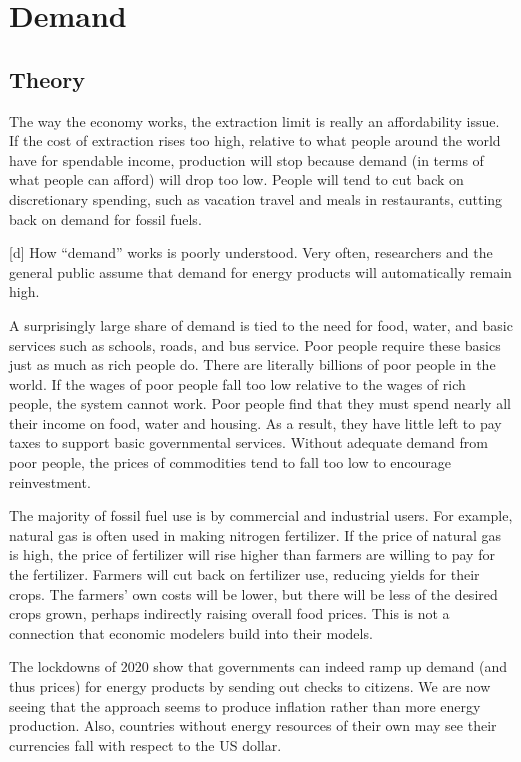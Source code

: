 \documentclass[
]{book}
\begin{document}
\hypertarget{demand}{%
\chapter{Demand}\label{demand}}

\hypertarget{theory}{%
\section{Theory}\label{theory}}

The way the economy works, the extraction limit is really an affordability issue. If the cost of extraction rises too high, relative to what people around the world have for spendable income, production will stop because demand (in terms of what people can afford) will drop too low. People will tend to cut back on discretionary spending, such as vacation travel and meals in restaurants, cutting back on demand for fossil fuels.

{[}d{]} How ``demand'' works is poorly understood. Very often, researchers and the general public assume that demand for energy products will automatically remain high.

A surprisingly large share of demand is tied to the need for food, water, and basic services such as schools, roads, and bus service. Poor people require these basics just as much as rich people do. There are literally billions of poor people in the world. If the wages of poor people fall too low relative to the wages of rich people, the system cannot work. Poor people find that they must spend nearly all their income on food, water and housing. As a result, they have little left to pay taxes to support basic governmental services. Without adequate demand from poor people, the prices of commodities tend to fall too low to encourage reinvestment.

The majority of fossil fuel use is by commercial and industrial users. For example, natural gas is often used in making nitrogen fertilizer. If the price of natural gas is high, the price of fertilizer will rise higher than farmers are willing to pay for the fertilizer. Farmers will cut back on fertilizer use, reducing yields for their crops. The farmers' own costs will be lower, but there will be less of the desired crops grown, perhaps indirectly raising overall food prices. This is not a connection that economic modelers build into their models.

The lockdowns of 2020 show that governments can indeed ramp up demand (and thus prices) for energy products by sending out checks to citizens. We are now seeing that the approach seems to produce inflation rather than more energy production. Also, countries without energy resources of their own may see their currencies fall with respect to the US dollar.
\end{document}
